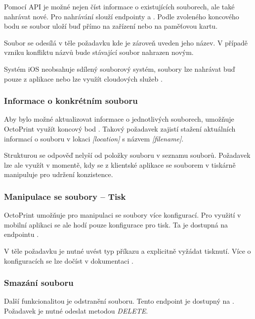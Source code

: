 Pomocí API je možné nejen číst informace o existujících souborech, ale také nahrávat nové.
Pro nahrávání slouží endpointy  a .
Podle zvoleného koncového bodu se soubor uloží buď přímo na zařízení nebo na paměťovou kartu.

Soubor se odesílá v těle požadavku kde je zároveň uveden jeho název.
V případě vzniku konfliktu názvů bude stávající soubor nahrazen novým.

Systém iOS neobsahuje sdílený souborový systém, soubory lze nahrávat buď pouze z aplikace nebo lze využít cloudových služeb \cite{apple-file-system-basics}.

\subsubsection*{Informace o konkrétním souboru}

Aby bylo možné aktualizovat informace o jednotlivých souborech, umožňuje OctoPrint využít koncový bod .
Takový požadavek zajistí stažení aktuálních informací o souboru v lokaci \textit{[location]} s názvem \textit{[filename]}.

Strukturou se odpověď nelyší od položky souboru v seznamu souborů.
Požadavek lze ale využít v momentě, kdy se z klientské aplikace se souborem v tiskárně manipuluje pro udržení konzistence.

\subsubsection*{Manipulace se soubory -- Tisk}

OctoPrint umožňuje pro manipulaci se soubory více konfigurací.
Pro využití v mobilní aplikaci se ale hodí pouze konfigurace pro tisk.
Ta je dostupná na endpointu .

V těle požadavku je nutné uvést typ příkazu a explicitně vyžádat tisknutí.
Více o konfiguracích se lze dočíst v dokumentaci \cite{octoprint-api-filecommand}.

\subsubsection*{Smazání souboru}

Další funkcionalitou je odstranění souboru.
Tento endpoint je dostupný na .
Požadavek je nutné odeslat metodou \textit{DELETE}.

